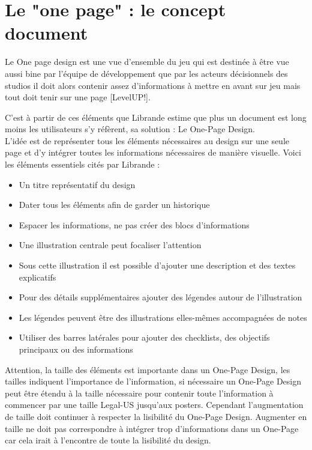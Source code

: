 \section{Le "one page" : le concept document}
Le One page design est une vue d'ensemble du jeu qui est destinée à être vue aussi bine par l'équipe de développement que par les acteurs décisionnels des studios il doit alors contenir assez d'informations à mettre en avant sur jeu mais tout doit tenir sur une page [LevelUP!].

C'est à partir de ces éléments que Librande estime que plus un document est long moins les utilisateurs s'y réfèrent, sa solution : Le One-Page Design.\\
L'idée est de représenter tous les éléments nécessaires au design sur une seule page et d'y intégrer toutes les informations nécessaires de manière visuelle. Voici les éléments essentiels cités par Librande :
\begin{itemize}
    \item Un titre représentatif du design
    \item Dater tous les éléments afin de garder un historique
    \item Espacer les informations, ne pas créer des blocs d'informations
    \item Une illustration centrale peut focaliser l'attention
    \item Sous cette illustration il est possible d'ajouter une description et des textes explicatifs
    \item Pour des détails supplémentaires ajouter des légendes autour de l'illustration
    \item Les légendes peuvent être des illustrations elles-mêmes accompagnées de notes
    \item Utiliser des barres latérales pour ajouter des checklists, des objectifs principaux ou des informations
\end{itemize}
Attention, la taille des éléments est importante dans un One-Page Design, les tailles indiquent l'importance de l'information, si nécessaire un One-Page Design peut être étendu à la taille nécessaire pour contenir toute l'information à commencer par une taille Legal-US jusqu'aux posters.
Cependant l'augmentation de taille doit continuer à respecter la lisibilité du One-Page Design. Augmenter en taille ne doit pas correspondre à intégrer trop d'informations dans un One-Page car cela irait à l'encontre de toute la lisibilité du design.


